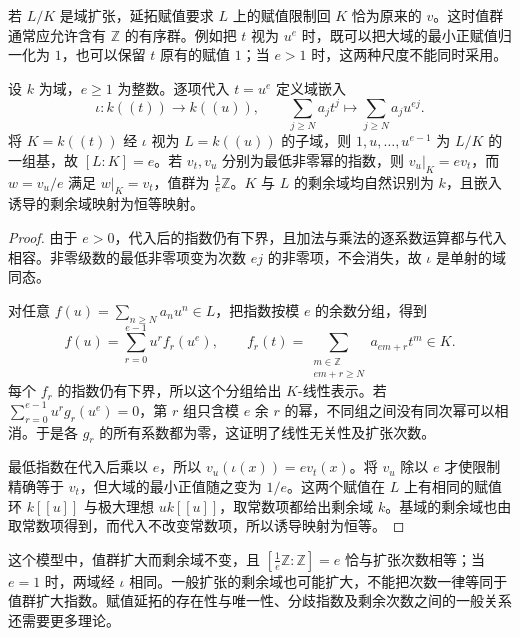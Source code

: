 \ProseParagraphBreak
若 \(L/K\) 是域扩张，延拓赋值要求 \(L\) 上的赋值限制回 \(K\) 恰为原来的 \(v\)。这时值群通常应允许含有 \(\mathbb Z\) 的有序群。例如把 \(t\) 视为 \(u^e\) 时，既可以把大域的最小正赋值归一化为 \(1\)，也可以保留 \(t\) 原有的赋值 \(1\)；当 \(e>1\) 时，这两种尺度不能同时采用。
\begin{proposition}\label{b1:prop:D-laurent-power-extension}
	设 \(k\) 为域，\(e\geq1\) 为整数。逐项代入 \(t=u^e\) 定义域嵌入
	\[
		\iota:k(\!(t)\!)\longrightarrow k(\!(u)\!),\qquad \sum_{j\geq N}a_jt^j\longmapsto\sum_{j\geq N}a_ju^{ej}.
	\]
	将 \(K=k(\!(t)\!)\) 经 \(\iota\) 视为 \(L=k(\!(u)\!)\) 的子域，则 \(1,u,\ldots,u^{e-1}\) 为 \(L/K\) 的一组基，故 \([L:K]=e\)。若 \(v_t,v_u\) 分别为最低非零幂的指数，则 \(v_u|_K=e v_t\)，而 \(w=v_u/e\) 满足 \(w|_K=v_t\)，值群为 \(\frac1e\mathbb Z\)。\(K\) 与 \(L\) 的剩余域均自然识别为 \(k\)，且嵌入诱导的剩余域映射为恒等映射。
\end{proposition}

\begin{proof}
	由于 \(e>0\)，代入后的指数仍有下界，且加法与乘法的逐系数运算都与代入相容。非零级数的最低非零项变为次数 \(ej\) 的非零项，不会消失，故 \(\iota\) 是单射的域同态。

	对任意 \(f(u)=\sum_{n\geq N}a_nu^n\in L\)，把指数按模 \(e\) 的余数分组，得到
	\[
		f(u)=\sum_{r=0}^{e-1}u^r f_r(u^e),\qquad f_r(t)=\sum_{\substack{m\in\mathbb Z\\ em+r\geq N}}a_{em+r}t^m\in K.
	\]
	每个 \(f_r\) 的指数仍有下界，所以这个分组给出 \(K\)-线性表示。若 \(\sum_{r=0}^{e-1}u^r g_r(u^e)=0\)，第 \(r\) 组只含模 \(e\) 余 \(r\) 的幂，不同组之间没有同次幂可以相消。于是各 \(g_r\) 的所有系数都为零，这证明了线性无关性及扩张次数。

	最低指数在代入后乘以 \(e\)，所以 \(v_u(\iota(x))=e v_t(x)\)。将 \(v_u\) 除以 \(e\) 才使限制精确等于 \(v_t\)，但大域的最小正值随之变为 \(1/e\)。这两个赋值在 \(L\) 上有相同的赋值环 \(k[\![u]\!]\) 与极大理想 \(u k[\![u]\!]\)，取常数项都给出剩余域 \(k\)。基域的剩余域也由取常数项得到，而代入不改变常数项，所以诱导映射为恒等。
\end{proof}

这个模型中，值群扩大而剩余域不变，且 \([\frac1e\mathbb Z:\mathbb Z]=e\) 恰与扩张次数相等；当 \(e=1\) 时，两域经 \(\iota\) 相同。一般扩张的剩余域也可能扩大，不能把次数一律等同于值群扩大指数。赋值延拓的存在性与唯一性、分歧指数及剩余次数之间的一般关系还需要更多理论。
